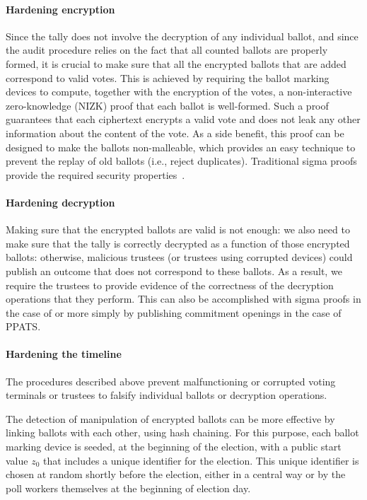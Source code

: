 \paragraph{Hardening encryption}
\label{sec:hardening-encryption}
Since the tally does not involve the decryption of any individual
ballot, and since the audit procedure relies on the fact that all
counted ballots are properly formed, it is crucial to make sure that
all the encrypted ballots that are added correspond to valid votes.
This is achieved by requiring the ballot marking devices to compute,
together with the encryption of the votes, a non-interactive
zero-knowledge (NIZK) proof that each ballot is well-formed. Such a
proof guarantees that each ciphertext encrypts a valid vote and does
not leak any other information about the content of the vote. As a
side benefit, this proof can be designed to make the ballots
non-malleable, which provides an easy technique to prevent the replay
of old ballots (i.e., reject duplicates). Traditional sigma proofs
provide the required security properties~\cite{BPW12}.

\paragraph{Hardening decryption}
\label{sec:hardening-decryption}
Making sure that the encrypted ballots are valid is not enough: we
also need to make sure that the tally is correctly decrypted as a
function of those encrypted ballots: otherwise, malicious trustees (or
trustees using corrupted devices) could publish an outcome that does
not correspond to these ballots. As a result, we require the trustees
to provide evidence of the correctness of the decryption operations
that they perform.  This can also be accomplished with sigma
proofs in the case of \elgamal or more simply by publishing commitment
openings in the case of PPATS.

\paragraph{Hardening the timeline}
\label{sec:hard-timeline}

The procedures described above prevent malfunctioning or corrupted
voting terminals or trustees to falsify individual ballots or decryption
operations.

The detection of manipulation of encrypted ballots can be more
effective by linking ballots with each other, using hash chaining.
For this purpose, each ballot marking device is seeded, at the
beginning of the election, with a public start value $z_0$ that
includes a unique identifier for the election.  This unique identifier
is chosen at random shortly before the election, either in a central
way or by the poll workers themselves at the beginning of election
day.

